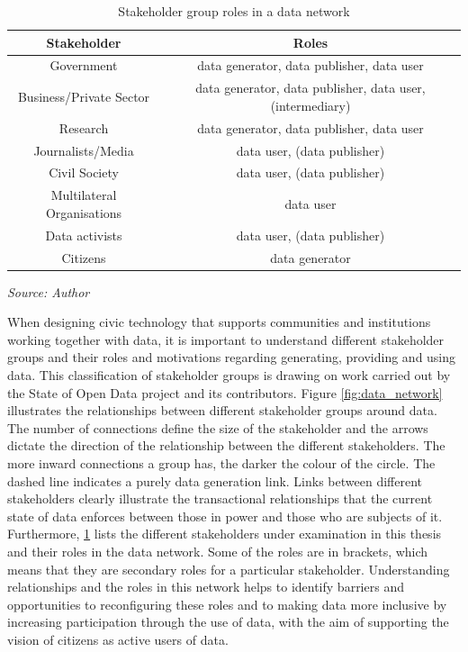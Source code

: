 \begin{table}[htb!]
\scriptsize
\centering
\begin{tabular}{|c|c|}
  \hline
	\textbf{Stakeholder} & \textbf{Roles} \\ [0.5ex]
  \hline
   \rowcolor[gray]{.9} Government &  data generator, data publisher, data user \\
   \hline
    Business/Private Sector &  data generator, data publisher, data user, (intermediary)  \\
  \hline
   \rowcolor[gray]{.9}  Research &  data generator, data publisher, data user \\
  \hline
    Journalists/Media &  data user, (data publisher) \\
  \hline
   \rowcolor[gray]{.9}  Civil Society &  data user, (data publisher) \\
  \hline
    Multilateral Organisations &  data user \\
  \hline
   \rowcolor[gray]{.9}  Data activists &  data user, (data publisher) \\
  \hline
    Citizens &  data generator \\ [0.5ex]
  \hline
\end{tabular}

\smallskip\centering
    \footnotesize\emph{Source: Author}
\caption[Data Roles]{Stakeholder group roles in a data network}
\label{table:data_roles}
\end{table}

When designing civic technology that supports communities and institutions working together with data, it is important to understand different stakeholder groups and their roles and motivations regarding generating, providing and using data. This classification of stakeholder groups is drawing on work carried out by the State of Open Data \citep{davies_state_2019} project and its contributors.
Figure \ref{fig:data_network} illustrates the relationships between different stakeholder groups around data. The number of connections define the size of the stakeholder and the arrows dictate the direction of the relationship between the different stakeholders. The more inward connections a group has, the darker the colour of the circle. The dashed line indicates a purely data generation link. Links between different stakeholders clearly illustrate the transactional relationships that the current state of data enforces between those in power and those who are subjects of it. Furthermore, \ref{table:data_roles} lists the different stakeholders under examination in this thesis and their roles in the data network. Some of the roles are in brackets, which means that they are secondary roles for a particular stakeholder. Understanding relationships and the roles in this network helps to identify barriers and opportunities to reconfiguring these roles and to making data more inclusive by increasing participation through the use of data, with the aim of supporting the vision of citizens as active users of data.

